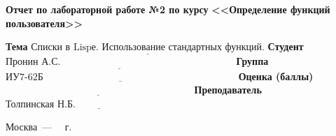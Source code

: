 \begin{titlepage}
	\begin{center}
		\noindent\begin{minipage}{1.1\textwidth}\centering
			\Large\textbf{  Отчет по лабораторной работе №2 по курсу}\newline
			\textbf{<<Определение функций пользователя>>}\newline
			\newline\newline
		\end{minipage}
	\end{center}
	
	\noindent\textbf{Тема} $\underline{\text{Списки в Lispе. Использование стандартных функций.}}$\newline\newline
	\noindent\textbf{Студент} $\underline{\text{Пронин А.С.~~~~~~~~~~~~~~~~~~~~~~~~~~~~~~~~~~~~~~~~~~~~~~~~~~~~~}}$\newline\newline
	\noindent\textbf{Группа} $\underline{\text{ИУ7-62Б~~~~~~~~~~~~~~~~~~~~~~~~~~~~~~~~~~~~~~~~~~~~~~~~~~~~~~~~~~~}}$\newline\newline
	\noindent\textbf{Оценка (баллы)} $\underline{\text{~~~~~~~~~~~~~~~~~~~~~~~~~~~~~~~~~~~~~~~~~~~~~~~~~~~~~~~~~}}$\newline\newline
	\noindent\textbf{Преподаватель} $\underline{\text{Толпинская Н.Б.~~~~~~~~~~~~~~~~~~~~~~~~~~~~~~~~~~~~}}$\newline\newline\newline
	
	\begin{center}
		\vfill
		Москва~---~\the\year
		~г.
	\end{center}
\end{titlepage}